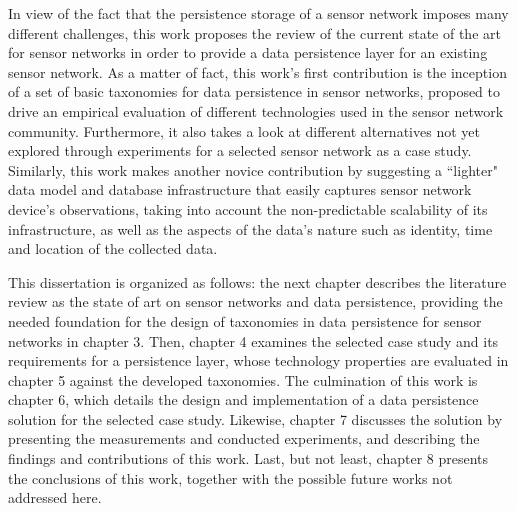 In view of the fact that the persistence storage of a sensor network imposes
many different challenges, this work proposes the review of the current state of
the art for sensor networks in order to provide a data persistence layer for an
existing sensor network. As a matter of fact, this work's first contribution is
the inception of a set of basic taxonomies for data persistence in sensor
networks, proposed to drive an empirical evaluation of different technologies
used in the sensor network community. Furthermore, it also takes a look at
different alternatives not yet explored through experiments for a selected
sensor network as a case study. Similarly, this work makes another novice
contribution by suggesting a ``lighter" data model and database infrastructure
that easily captures sensor network device's observations, taking into account
the non-predictable scalability of its infrastructure, as well as the aspects of
the data's nature such as identity, time and location of the collected data.

This dissertation is organized as follows: the next chapter describes the
literature review as the state of art on sensor networks and data persistence, 
providing the needed foundation for the design of taxonomies in data
persistence for sensor networks in chapter 3. Then, chapter 4 examines the
selected case study and its requirements for a persistence layer, whose
technology properties are evaluated in chapter 5 against the developed
taxonomies. The culmination of this work is chapter 6, which details the design
and implementation of a data persistence solution for the selected case
study. Likewise, chapter 7 discusses the solution by presenting the
measurements and conducted experiments, and describing the findings
and contributions of this work. Last, but not least, chapter 8 presents the
conclusions of this work, together with the possible future works not addressed
here.